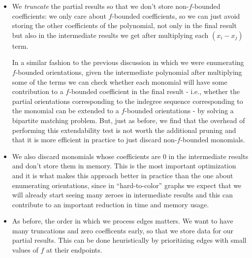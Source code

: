 \begin{itemize}
	\item We \emph{truncate} the partial results so that we don't store non-$f$-bounded coefficients:
	we only care about $f$-bounded coefficients, so we can just avoid storing the other coefficients of the 
	polynomial, not only in the final result but also in the intermediate results we get after multiplying each
	$(x_i-x_j)$ term. 
	
	In a similar fashion to the previous discussion in which we were enumerating $f$-bounded orientations, given 
	the intermediate polynomial after multiplying some of the terms we can check whether each monomial will have
	some contribution to a $f$-bounded coefficient in the final result - i.e., whether the partial orientations
	corresponding to the indegree sequence corresponding to the monomial can be extended to a $f$-bounded orientations
	- by solving a bipartite matching problem. But, just as before, we find that the overhead of performing this
	extendability test is not worth the additional pruning and that it is more efficient in practice to just discard
	non-$f$-bounded monomials. 
	
	
	\item We also discard monomials whose coefficients are $0$ in the intermediate results and don't store them in
	memory. This is the most important optimization and it is what makes this approach better in practice than the
	one about enumerating orientations, since in ``hard-to-color'' graphs we expect that we will already start seeing
	many zeroes in intermediate results and this can contribute to an important reduction in time and memory usage.
	
	\item As before, the order in which we process edges matters. We want to have many truncations and 
	zero coefficents early, so that we store data for our partial results. This can be done heuristically 
	by prioritizing edges with small values of $f$ at their endpoints. 

\end{itemize}


